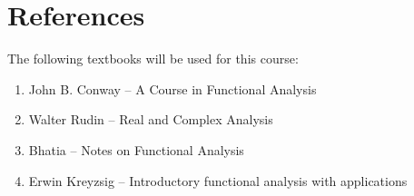 \section*{References}
The following textbooks will be used for this course:
\begin{enumerate}
    \item John B. Conway -- A Course in Functional Analysis
    \item Walter Rudin -- Real and Complex Analysis
    \item Bhatia -- Notes on Functional Analysis
    \item Erwin Kreyzsig -- Introductory functional analysis with applications
\end{enumerate}
